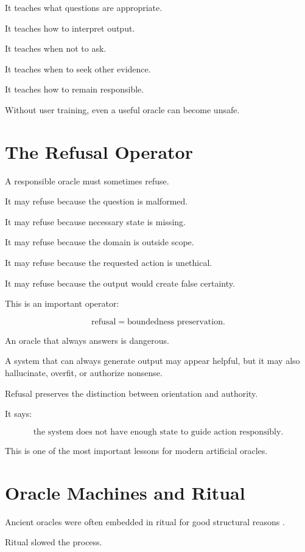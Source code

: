 \documentclass[11pt]{book}
\begin{document}
It teaches what questions are appropriate.

It teaches how to interpret output.

It teaches when not to ask.

It teaches when to seek other evidence.

It teaches how to remain responsible.

Without user training, even a useful oracle can become unsafe.

\section{The Refusal Operator}

A responsible oracle must sometimes refuse.

It may refuse because the question is malformed.

It may refuse because necessary state is missing.

It may refuse because the domain is outside scope.

It may refuse because the requested action is unethical.

It may refuse because the output would create false certainty.

This is an important operator:

\[
\text{refusal} = \text{boundedness preservation}.
\]

An oracle that always answers is dangerous.

A system that can always generate output may appear helpful, but it may also hallucinate, overfit, or authorize nonsense.

Refusal preserves the distinction between orientation and authority.

It says:

\[
\text{the system does not have enough state to guide action responsibly}.
\]

This is one of the most important lessons for modern artificial oracles.

\section{Oracle Machines and Ritual}

Ancient oracles were often embedded in ritual for good structural reasons \cite{Fontenrose1978DelphicOracle,Loewe1994DivinationMythologyMonarchy,Bell1992RitualTheory}.

Ritual slowed the process.
\end{document}
